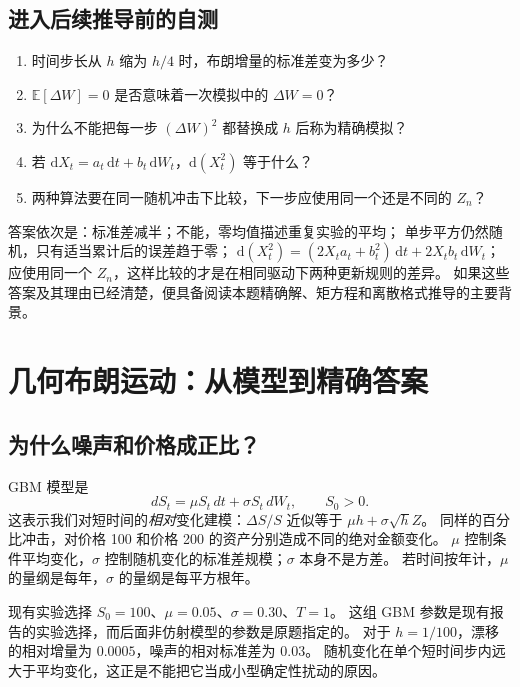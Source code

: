 \documentclass[11pt,a4paper,fontset=none]{ctexart}
\numberwithin{equation}{section}
\newcommand{\E}{\mathbb E}
\begin{document}
\subsection{进入后续推导前的自测}
\label{bg:sub:self-check}

\begin{enumerate}
  \item 时间步长从 $h$ 缩为 $h/4$ 时，布朗增量的标准差变为多少？
  \item $\E[\Delta W]=0$ 是否意味着一次模拟中的 $\Delta W=0$？
  \item 为什么不能把每一步 $(\Delta W)^2$ 都替换成 $h$ 后称为精确模拟？
  \item 若 $\mathrm dX_t=a_t\,\mathrm dt+b_t\,\mathrm dW_t$，$\mathrm d(X_t^2)$ 等于什么？
  \item 两种算法要在同一随机冲击下比较，下一步应使用同一个还是不同的 $Z_n$？
\end{enumerate}

答案依次是：标准差减半；不能，零均值描述重复实验的平均；
单步平方仍然随机，只有适当累计后的误差趋于零；
$\mathrm d(X_t^2)=(2X_ta_t+b_t^2)\,\mathrm dt+2X_tb_t\,\mathrm dW_t$；
应使用同一个 $Z_n$，这样比较的才是在相同驱动下两种更新规则的差异。
如果这些答案及其理由已经清楚，便具备阅读本题精确解、矩方程和离散格式推导的主要背景。


\section{几何布朗运动：从模型到精确答案}\label{sec:gbm}
\subsection{为什么噪声和价格成正比？}
GBM 模型是
\begin{equation}\label{eq:gbm-model}
 dS_t=\mu S_t\,dt+\sigma S_t\,dW_t,\qquad S_0>0.
\end{equation}
这表示我们对短时间的\emph{相对}变化建模：$\Delta S/S$ 近似等于 $\mu h+\sigma\sqrt h Z$。
同样的百分比冲击，对价格 100 和价格 200 的资产分别造成不同的绝对金额变化。
$\mu$ 控制条件平均变化，$\sigma$ 控制随机变化的标准差规模；$\sigma$ 本身不是方差。
若时间按年计，$\mu$ 的量纲是每年，$\sigma$ 的量纲是每平方根年。

现有实验选择 $S_0=100$、$\mu=0.05$、$\sigma=0.30$、$T=1$。
这组 GBM 参数是现有报告的实验选择，而后面非仿射模型的参数是原题指定的。
对于 $h=1/100$，漂移的相对增量为 $0.0005$，噪声的相对标准差为 $0.03$。
随机变化在单个短时间步内远大于平均变化，这正是不能把它当成小型确定性扰动的原因。
\end{document}
